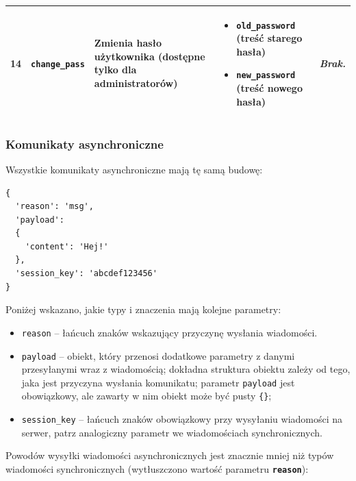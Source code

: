 {\begin{longtable}{ | l | l | l | l | l | }
\hline

\parbox[t]{0.8cm}{
	14

} & \parbox[t]{1.7cm}{\strut
	\texttt{change\_pass}

\strut} & \parbox{4.1cm}{
	Zmienia hasło użytkownika (dostępne tylko dla administratorów)

} & \parbox{3.9cm}{
	\begin{itemize}
		\item \texttt{old\_password} (treść starego hasła)
		\item \texttt{new\_password} (treść nowego hasła)
	\end{itemize}


} & \parbox{3.9cm}{
	\textit{Brak.}
} \\

\hline

\end{longtable}
}

\subsubsection{Komunikaty asynchroniczne}
Wszystkie komunikaty asynchroniczne mają tę samą budowę:

\begin{lstlisting}
{
  'reason': 'msg',
  'payload':
  {
    'content': 'Hej!'
  },
  'session_key': 'abcdef123456'
}
\end{lstlisting}

Poniżej wskazano, jakie typy i znaczenia mają kolejne parametry:
\begin{itemize}
	\item \texttt{reason} -- łańcuch znaków wskazujący przyczynę wysłania wiadomości.

	\item \texttt{payload} -- obiekt, który przenosi dodatkowe parametry z danymi
	przesyłanymi wraz z wiadomością;
	dokładna struktura obiektu zależy od tego, jaka jest przyczyna wysłania
	komunikatu; parametr \texttt{payload} jest obowiązkowy, ale
	zawarty w nim obiekt może być pusty \texttt{\{\}};

	\item \texttt{session\_key} -- łańcuch znaków obowiązkowy przy wysyłaniu
	wiadomości na serwer, patrz analogiczny parametr we wiadomościach synchronicznych.

\end{itemize}

Powodów wysyłki wiadomości asynchronicznych jest znacznie mniej niż typów wiadomości
synchronicznych (wytłuszczono wartość parametru \textbf{\texttt{reason}}):

